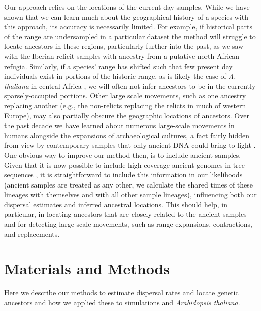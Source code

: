 \documentclass[12pt]{article}
\begin{document}
Our approach relies on the locations of the current-day samples. While we have shown that we can learn much about the geographical history of a species with this approach, its accuracy is necessarily limited. For example, if historical parts of the range are undersampled in a particular dataset the method will struggle to locate ancestors in these regions, particularly further into the past, as we saw with the Iberian relicit samples with ancestry from a putative north African refugia. Similarly, if a species' range has shifted such that few present day individuals exist in portions of the historic range, as is likely the case of \textit{A. thaliana} in central Africa \citep{fulgione2018archaic}, we will often not infer ancestors to be in the currently sparsely-occupied portions. Other large scale movements, such as one ancestry replacing another (e.g., the non-relicts replacing the relicts in much of western Europe), may also partially obscure the geographic locations of ancestors. Over the past decade we have learned about numerous large-scale movements in humans alongside the expansions of archaeological cultures, a fact fairly hidden from view by contemporary samples that only ancient DNA could bring to light \citep{slatkin2016ancient,reich2018we}. One obvious way to improve our method then, is to include ancient samples. Given that it is now possible to include high-coverage ancient genomes in tree sequences \citep{speidel2021inferring,wohns2021unified}, it is straightforward to include this information in our likelihoods (ancient samples are treated as any other, we calculate the shared times of these lineages with themselves and with all other sample lineages), influencing both our dispersal estimates and inferred ancestral locations. This should help, in particular, in locating ancestors that are closely related to the ancient samples and for detecting large-scale movements, such as range expansions, contractions, and replacements.

\section*{Materials and Methods}
\label{sec:methods}

Here we describe our methods to estimate dispersal rates and locate genetic ancestors and how we applied these to simulations and \textit{Arabidopsis thaliana}.
\end{document}
